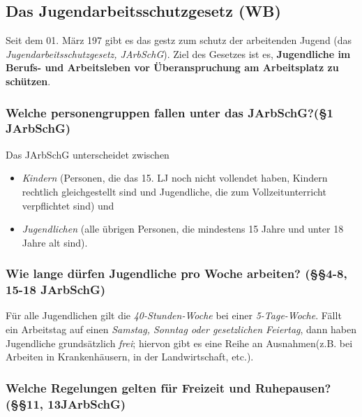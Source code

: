 \documentclass[a4paper, 12pt]{report}
\begin{document}
\begin{multicols}{2}
\section{Das Jugendarbeitsschutzgesetz (WB)}

Seit dem 01. März 197 gibt es das gestz zum schutz der arbeitenden Jugend (das
\emph{Jugendarbeitsschutzgesetz, JArbSchG}). Ziel des Gesetzes ist es,
\textbf{Jugendliche im Berufs- und Arbeitsleben vor Überanspruchung am
Arbeitsplatz zu schützen}. \\

\subsubsection{Welche personengruppen fallen unter das JArbSchG?(\S 1 JArbSchG)}
Das JArbSchG unterscheidet zwischen
\begin{itemize}
    \item \emph{Kindern} (Personen, die das 15. LJ noch nicht vollendet haben,
	Kindern rechtlich gleichgestellt sind und Jugendliche, die zum
	Vollzeitunterricht verpflichtet sind) und
    \item \emph{Jugendlichen} (alle übrigen Personen, die mindestens 15 Jahre
	und unter 18 Jahre alt sind).
\end{itemize}

\subsubsection{Wie lange dürfen Jugendliche pro Woche arbeiten?
(\S\S 4-8, 15-18 JArbSchG)}

Für alle Jugendlichen gilt die \emph{40-Stunden-Woche} bei einer
\emph{5-Tage-Woche}. Fällt ein Arbeitstag auf einen \emph{Samstag, Sonntag oder
gesetzlichen Feiertag}, dann haben Jugendliche grundsätzlich \emph{frei};
hiervon gibt es eine Reihe an Ausnahmen(z.B. bei Arbeiten in Krankenhäusern, in
der Landwirtschaft, etc.).

\subsubsection{Welche Regelungen gelten für Freizeit und Ruhepausen?
(\S\S 11, 13JArbSchG)}


\end{multicols}
\end{document}
